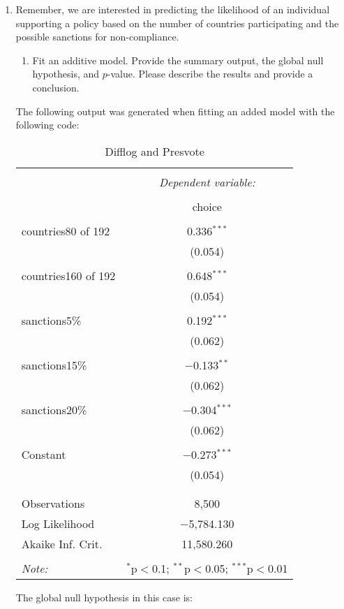 \documentclass[12pt,letterpaper]{article}
\begin{document}
\begin{enumerate}
	\item
	Remember, we are interested in predicting the likelihood of an individual supporting a policy based on the number of countries participating and the possible sanctions for non-compliance.
	\begin{enumerate}
		\item [] Fit an additive model. Provide the summary output, the global null hypothesis, and $p$-value. Please describe the results and provide a conclusion.
	\end{enumerate}
\noindent The following output was generated when fitting an added model with the following code:

\begin{table}[!htbp] \centering 
	\caption{Difflog and Presvote} 
	\label{} 
	\begin{tabular}{@{\extracolsep{5pt}}lc} 
		\\[-1.8ex]\hline 
		\hline \\[-1.8ex] 
		& \multicolumn{1}{c}{\textit{Dependent variable:}} \\ 
		\cline{2-2} 
		\\[-1.8ex] & choice \\ 
		\hline \\[-1.8ex] 
		countries80 of 192 & 0.336$^{***}$ \\ 
		& (0.054) \\ 
		& \\ 
		countries160 of 192 & 0.648$^{***}$ \\ 
		& (0.054) \\ 
		& \\ 
		sanctions5\% & 0.192$^{***}$ \\ 
		& (0.062) \\ 
		& \\ 
		sanctions15\% & $-$0.133$^{**}$ \\ 
		& (0.062) \\ 
		& \\ 
		sanctions20\% & $-$0.304$^{***}$ \\ 
		& (0.062) \\ 
		& \\ 
		Constant & $-$0.273$^{***}$ \\ 
		& (0.054) \\ 
		& \\ 
		\hline \\[-1.8ex] 
		Observations & 8,500 \\ 
		Log Likelihood & $-$5,784.130 \\ 
		Akaike Inf. Crit. & 11,580.260 \\ 
		\hline 
		\hline \\[-1.8ex] 
		\textit{Note:}  & \multicolumn{1}{r}{$^{*}$p$<$0.1; $^{**}$p$<$0.05; $^{***}$p$<$0.01} \\ 
	\end{tabular} 
\end{table} 
\noindent The global null hypothesis in this case is:


\end{enumerate}
\end{document}
